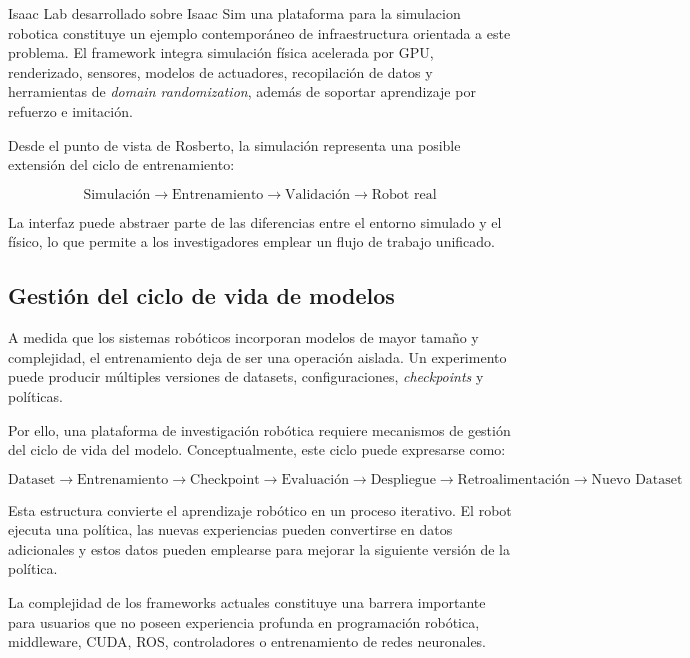 \documentclass[stu,12pt,floatsintext]{apa7}
\begin{document}
Isaac Lab desarrollado sobre Isaac Sim una plataforma para la simulacion robotica \parencite{gao2026nvidiaisaacsimenabling} constituye un ejemplo contemporáneo de infraestructura orientada a este problema. El framework integra simulación física acelerada por GPU, renderizado, sensores, modelos de actuadores, recopilación de datos y herramientas de \textit{domain randomization}, además de soportar aprendizaje por refuerzo e imitación.

Desde el punto de vista de Rosberto, la simulación representa una posible extensión del ciclo de entrenamiento:

\begin{equation}
\text{Simulación}
\rightarrow
\text{Entrenamiento}
\rightarrow
\text{Validación}
\rightarrow
\text{Robot real}
\end{equation}

La interfaz puede abstraer parte de las diferencias entre el entorno simulado y el físico, lo que permite a los investigadores emplear un flujo de trabajo unificado.

\subsection{Gestión del ciclo de vida de modelos}

A medida que los sistemas robóticos incorporan modelos de mayor tamaño y complejidad, el entrenamiento deja de ser una operación aislada. Un experimento puede producir múltiples versiones de datasets, configuraciones, \textit{checkpoints} y políticas.

Por ello, una plataforma de investigación robótica requiere mecanismos de gestión del ciclo de vida del modelo. Conceptualmente, este ciclo puede expresarse como:

\begin{equation}
\text{Dataset}
\rightarrow
\text{Entrenamiento}
\rightarrow
\text{Checkpoint}
\rightarrow
\text{Evaluación}
\rightarrow
\text{Despliegue}
\rightarrow
\text{Retroalimentación}
\rightarrow
\text{Nuevo Dataset}
\end{equation}

Esta estructura convierte el aprendizaje robótico en un proceso iterativo. El robot ejecuta una política, las nuevas experiencias pueden convertirse en datos adicionales y estos datos pueden emplearse para mejorar la siguiente versión de la política.

La complejidad de los frameworks actuales constituye una barrera importante para usuarios que no poseen experiencia profunda en programación robótica, middleware, CUDA, ROS, controladores o entrenamiento de redes neuronales.
\end{document}
